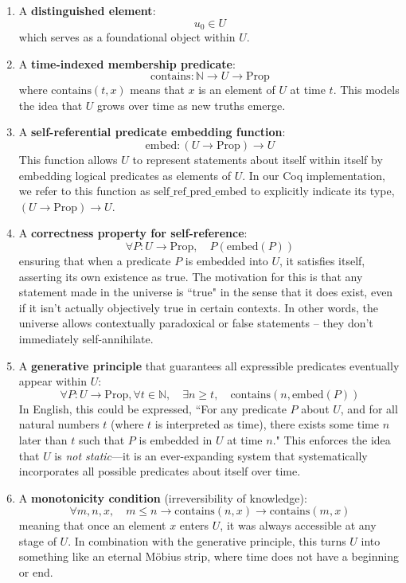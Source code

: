 \documentclass[12pt]{article}
\begin{document}
\begin{enumerate}
    \item A \textbf{distinguished element}:
    \[
    u_0 \in U
    \]
    which serves as a foundational object within \( U \).

    \item A \textbf{time-indexed membership predicate}:
    \[
    \text{contains}: \mathbb{N} \to U \to \text{Prop}
    \]
    where \( \text{contains}(t, x) \) means that \( x \) is an element of \( U \) at time \( t \). This models the idea that \( U \) grows over time as new truths emerge.

    \item A \textbf{self-referential predicate embedding function}:
    \[
    \text{embed}: (U \to \text{Prop}) \to U
    \]
    This function allows \( U \) to represent statements about itself within itself by embedding logical predicates as elements of \( U \). 
    In our Coq implementation, we refer to this function as $\text{self\_ref\_pred\_embed}$ to explicitly indicate its type, $(U \to \text{Prop}) \to U$.


    \item A \textbf{correctness property for self-reference}:
    \[
    \forall P: U \to \text{Prop}, \quad P(\text{embed}(P))
    \]
    ensuring that when a predicate \( P \) is embedded into \( U \), it satisfies itself, asserting its own existence as true. The motivation for this is that any statement made in the universe is ``true" in the sense that it does exist, even if it isn't actually objectively true in certain contexts. In other words, the universe allows contextually paradoxical or false statements -- they don't immediately self-annihilate.

    \item A \textbf{generative principle} that guarantees all expressible predicates eventually appear within \( U \):
    \[
    \forall P: U \to \text{Prop}, \forall t \in \mathbb{N}, \quad \exists n \geq t, \quad \text{contains}(n, \text{embed}(P))
    \]
    In English, this could be expressed, ``For any predicate $P$ about $U$, and for all natural numbers $t$ (where $t$ is interpreted as time), there exists some time $n$ later than $t$ such that $P$ is embedded in $U$ at time $n$." This enforces the idea that \( U \) is \textit{not static}—it is an ever-expanding system that systematically incorporates all possible predicates about itself over time.

    \item A \textbf{monotonicity condition} (irreversibility of knowledge):
    \[
    \forall m, n, x, \quad m \leq n \rightarrow \text{contains}(n, x) \rightarrow \text{contains}(m, x)
    \]
    meaning that once an element \( x \) enters \( U \), it was always accessible at any stage of \( U \). In combination with the generative principle, this turns \( U \) into something like an eternal Möbius strip, where time does not have a beginning or end.
\end{enumerate}
\end{document}
